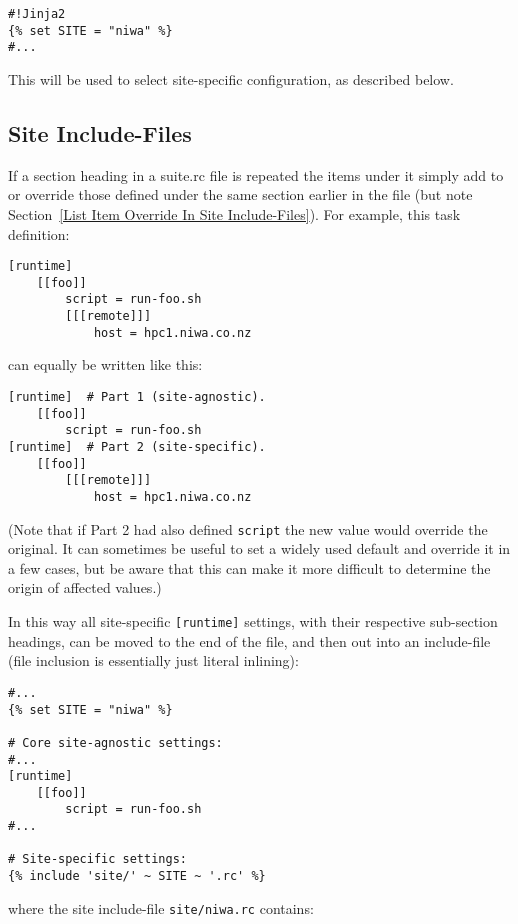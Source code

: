 \lstset{language=suiterc}
\begin{lstlisting}
#!Jinja2
{% set SITE = "niwa" %}
#...
\end{lstlisting}

This will be used to select site-specific configuration, as described below.

\subsection{Site Include-Files}

If a section heading in a suite.rc file is repeated the items under it simply
add to or override those defined under the same section earlier in the file
(but note Section~\ref{List Item Override In Site Include-Files}).
For example, this task definition:

\begin{lstlisting}
[runtime]
    [[foo]]
        script = run-foo.sh
        [[[remote]]]
            host = hpc1.niwa.co.nz
\end{lstlisting}

can equally be written like this:

\begin{lstlisting}
[runtime]  # Part 1 (site-agnostic).
    [[foo]]
        script = run-foo.sh
[runtime]  # Part 2 (site-specific).
    [[foo]]
        [[[remote]]]
            host = hpc1.niwa.co.nz
\end{lstlisting}

(Note that if Part 2 had also defined \lstinline=script= the new value would
override the original. It can sometimes be useful to set a widely used
default and override it in a few cases, but be aware that this can make it more 
difficult to determine the origin of affected values.)

In this way all site-specific \lstinline=[runtime]= settings, with their
respective sub-section headings, can be moved to the end of the file, and then
out into an include-file (file inclusion is essentially just literal inlining):

\begin{lstlisting}
#...
{% set SITE = "niwa" %}

# Core site-agnostic settings:
#...
[runtime]
    [[foo]]
        script = run-foo.sh
#...

# Site-specific settings:
{% include 'site/' ~ SITE ~ '.rc' %}
\end{lstlisting}

where the site include-file \lstinline=site/niwa.rc= contains:

